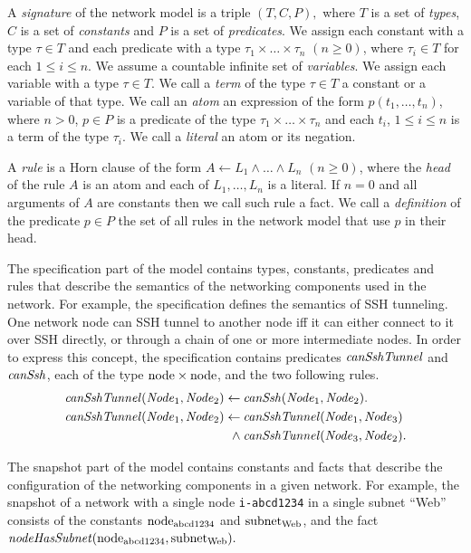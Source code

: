 A \emph{signature} of the network model is a triple $(T, C, P),$ where $T$ is a set of \emph{types}, $C$ is a set of \emph{constants} and $P$ is a set of \emph{predicates}. We assign each constant with a type $\tau\in T$ and each predicate with a type $\tau_1\times\ldots\times\tau_n$ $(n\ge0)$, where $\tau_i\in T$ for each $1\leq i \leq n$. We assume a countable infinite set of \emph{variables}. We assign each variable with a type $\tau\in T$. We call a \emph{term} of the type $\tau\in T$ a constant or a variable of that type. We call an \emph{atom} an expression of the form $p(t_1,\ldots,t_n)$, where $n>0$, $p\in P$ is a predicate of the type $\tau_1\times\ldots\times\tau_n$ and each $t_i$, $1\leq i \leq n$ is a term of the type $\tau_i$. We call a \emph{literal} an atom or its negation.

A \emph{rule} is a Horn clause of the form $A\leftarrow L_1 \wedge \ldots \wedge L_n$ $(n \ge 0)$, where the \emph{head} of the rule $A$ is an atom and each of $L_1,\ldots,L_n$ is a literal. If $n=0$ and all arguments of $A$ are constants then we call such rule a fact. We call a \emph{definition} of the predicate $p \in P$ the set of all rules in the network model that use $p$ in their head.

The specification part of the model contains types, constants, predicates and rules that describe the semantics of the networking components used in the network. For example, the specification defines the semantics of SSH tunneling. One network node can SSH tunnel to another node iff it can either connect to it over SSH directly, or through a chain of one or more intermediate nodes. In order to express this concept, the specification contains predicates $\mathit{canSshTunnel}$ and $\mathit{canSsh}$, each of the type $\mathrm{node}\times\mathrm{node}$, and the two following rules.
\begin{align*}
\mathit{canSshTunnel}(\mathit{Node}_1,\mathit{Node}_2)\leftarrow\:&\mathit{canSsh}(\mathit{Node}_1,\mathit{Node}_2). \\
\mathit{canSshTunnel}(\mathit{Node}_1,\mathit{Node}_2)\leftarrow\:&\mathit{canSshTunnel}(\mathit{Node}_1,\mathit{Node}_3)\\
\wedge\:&\mathit{canSshTunnel}(\mathit{Node}_3,\mathit{Node}_2).
\end{align*}

The snapshot part of the model contains constants and facts that describe the configuration of the networking components in a given network. For example, the snapshot of a network with a single node \verb'i-abcd1234' in a single subnet ``Web'' consists of the constants $\mathrm{node}_\text{abcd1234}$ and $\mathrm{subnet}_\text{Web}$, and the fact $\mathit{nodeHasSubnet}(\mathrm{node}_\text{abcd1234},\mathrm{subnet}_\text{Web}).$

